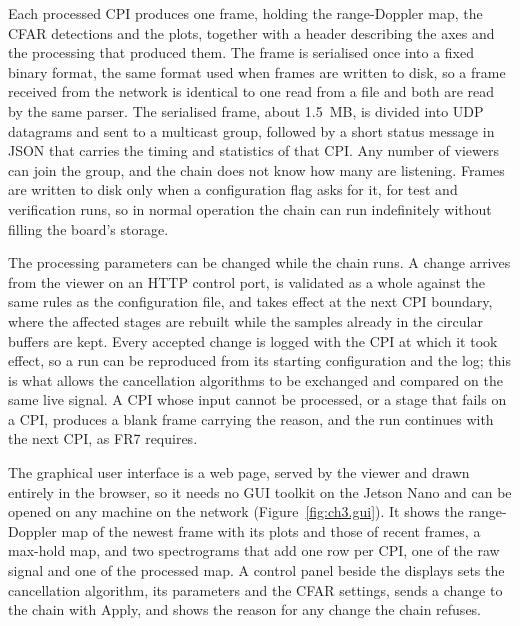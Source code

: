 Each processed CPI produces one frame, holding the range-Doppler map, the CFAR detections and the plots, together with a header describing the axes and the processing that produced them. The frame is serialised once into a fixed binary format, the same format used when frames are written to disk, so a frame received from the network is identical to one read from a file and both are read by the same parser. The serialised frame, about 1.5~MB, is divided into UDP datagrams and sent to a multicast group, followed by a short status message in JSON that carries the timing and statistics of that CPI. Any number of viewers can join the group, and the chain does not know how many are listening. Frames are written to disk only when a configuration flag asks for it, for test and verification runs, so in normal operation the chain can run indefinitely without filling the board's storage.

The processing parameters can be changed while the chain runs. A change arrives from the viewer on an HTTP control port, is validated as a whole against the same rules as the configuration file, and takes effect at the next CPI boundary, where the affected stages are rebuilt while the samples already in the circular buffers are kept. Every accepted change is logged with the CPI at which it took effect, so a run can be reproduced from its starting configuration and the log; this is what allows the cancellation algorithms to be exchanged and compared on the same live signal. A CPI whose input cannot be processed, or a stage that fails on a CPI, produces a blank frame carrying the reason, and the run continues with the next CPI, as FR7 requires.

The graphical user interface is a web page, served by the viewer and drawn entirely in the browser, so it needs no GUI toolkit on the Jetson Nano and can be opened on any machine on the network (Figure~\ref{fig:ch3.gui}). It shows the range-Doppler map of the newest frame with its plots and those of recent frames, a max-hold map, and two spectrograms that add one row per CPI, one of the raw signal and one of the processed map. A control panel beside the displays sets the cancellation algorithm, its parameters and the CFAR settings, sends a change to the chain with Apply, and shows the reason for any change the chain refuses.

